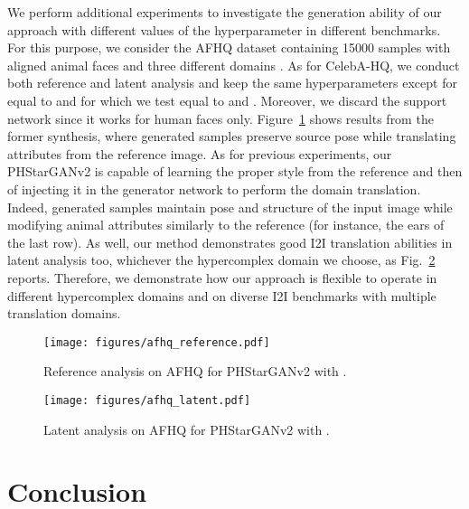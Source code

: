\documentclass[conference]{IEEEtran}
\begin{document}
We perform additional experiments to investigate the generation ability of our approach with different values of the hyperparameter  in different benchmarks. For this purpose, we consider the AFHQ dataset containing 15000 samples with aligned animal faces and three different domains \cite{Choi2020StarGAN2}. As for CelebA-HQ, we conduct both reference and latent analysis and keep the same hyperparameters except for  equal to  and for  which we test equal to  and . Moreover, we discard the support network since it works for human faces only. Figure~\ref{fig:reference_afhq} shows results from the former synthesis, where generated samples preserve source pose while translating attributes from the reference image. As for previous experiments, our PHStarGANv2 is capable of learning the proper style from the reference and then of injecting it in the generator network to perform the domain translation. Indeed, generated samples maintain pose and structure of the input image while modifying animal attributes similarly to the reference (for instance, the ears of the last row). As well, our method demonstrates good I2I translation abilities in latent analysis too, whichever the hypercomplex domain we choose, as Fig.~\ref{fig:latent_afhq} reports. Therefore, we demonstrate how our approach is flexible to operate in different hypercomplex domains and on diverse I2I benchmarks with multiple translation domains.

\begin{figure}[h!]
    \centering
    \texttt{[image: figures/afhq\_reference.pdf]}
    \caption{Reference analysis on AFHQ for PHStarGANv2 with .}
    \label{fig:reference_afhq}
\end{figure}

\begin{figure}[h!]
    \centering
    \texttt{[image: figures/afhq\_latent.pdf]}
    \caption{Latent analysis on AFHQ for PHStarGANv2 with .}
    \label{fig:latent_afhq}
\end{figure}





















\section{Conclusion}
\label{sec:conc}
\end{document}
